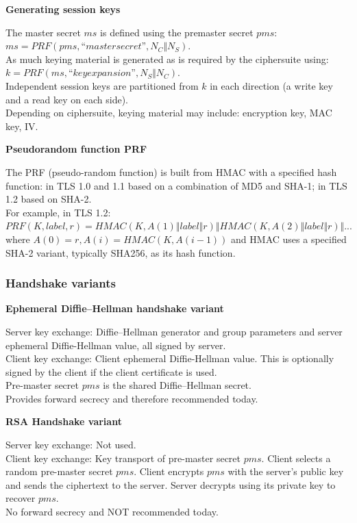 \documentclass{article}
\begin{document}
\textbf{Generating session keys}

The master secret $ms$ is defined using the premaster secret $pms$: $ms=PRF(pms,“master secret”,N_C\Vert N_S)$.\\
As much keying material is generated as is required by the ciphersuite using: $k=PRF(ms,“key expansion”,N_S\Vert N_C)$.\\
Independent session keys are partitioned from $k$ in each direction (a write key and a read key on each side).\\
Depending on ciphersuite, keying material may include: encryption key, MAC key, IV.

\textbf{Pseudorandom function PRF}

The PRF (pseudo-random function) is built from HMAC with a specified hash function: in TLS 1.0 and 1.1 based on a combination of MD5 and SHA-1; in TLS 1.2  based on SHA-2.\\
For example, in TLS 1.2: $PRF(K,label,r)  =HMAC(K,A(1) \Vert label \Vert r) \Vert HMAC(K,A(2)\Vert label \Vert r)\Vert...$ where $A(0) =r, A(i) =HMAC(K,A(i−1))$ and HMAC uses a specified SHA-2 variant, typically SHA256, as its hash function.

\subsubsection{Handshake variants}

\textbf{Ephemeral Diffie–Hellman handshake variant}

Server key exchange: Diffie–Hellman generator and group parameters and server ephemeral Diffie-Hellman value, all signed by server.\\
Client key exchange: Client ephemeral Diffie-Hellman value. This is optionally signed by the client if the client certificate is used.\\
Pre-master secret $pms$ is the shared Diffie–Hellman secret.\\
Provides forward secrecy and therefore recommended today.

\textbf{RSA Handshake variant}

Server key exchange: Not used.\\
Client key exchange: Key transport of pre-master secret $pms$. Client selects a random pre-master secret $pms$. Client encrypts $pms$ with the server’s public key and sends the ciphertext to the server. Server decrypts using its private key to recover $pms$.\\
No forward secrecy and NOT recommended today.
\end{document}
